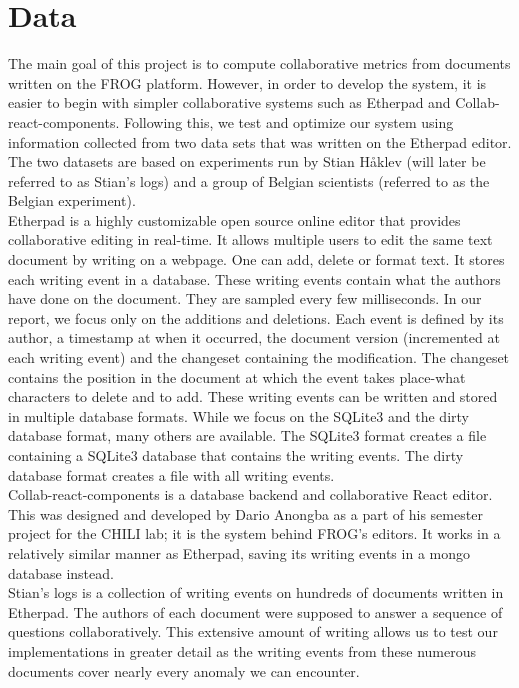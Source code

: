 \documentclass[a4, twocolumn, 12pt]{article}
\begin{document}
\section{Data}
The main goal of this project is to compute collaborative metrics from documents written on the FROG platform. However, in order to develop the system, it is easier to begin with simpler collaborative systems such as Etherpad and Collab-react-components. Following this, we test and optimize our system using information collected from two data sets that was written on the Etherpad editor. The two datasets are based on experiments run by Stian Håklev (will later be referred to as Stian’s logs) and a group of Belgian scientists (referred to as the Belgian experiment).
\\
Etherpad is a highly customizable open source online editor that provides collaborative editing in real-time. It allows multiple users to edit the same text document by writing on a webpage. One can add, delete or format text. It stores each writing event in a database. These writing events contain what the authors have done on the document. They are sampled every few milliseconds. In our report, we focus only on the additions and deletions. Each event is defined by its author, a timestamp at when it occurred, the document version (incremented at each writing event) and the changeset containing the modification. The changeset contains the position in the document at which the event takes place-what characters to delete and to add. These writing events can be written and stored in multiple database formats. While we focus on the SQLite3 and the dirty database format, many others are available. The SQLite3 format creates a file containing a SQLite3 database that contains the writing events. The dirty database format creates a file with all writing events.\\
Collab-react-components is a database backend and collaborative React editor. This was designed and developed by Dario Anongba as a part of his semester project for the CHILI lab; it is the system behind FROG’s editors. It works in a relatively similar manner as Etherpad, saving its writing events in a mongo database instead. \\
Stian’s logs is a collection of writing events on hundreds of documents written in Etherpad. The authors of each document were supposed to answer a sequence of questions collaboratively. This extensive amount of writing allows us to test our implementations in greater detail as the writing events from these numerous documents cover nearly every anomaly we can encounter. \\
\end{document}
